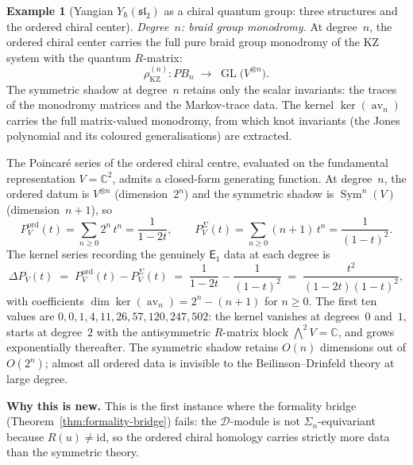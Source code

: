 \documentclass[11pt,reqno]{amsart}
\theoremstyle{definition}
\newtheorem{example}[theorem]{Example}
\theoremstyle{remark}
\newcommand{\cD}{\mathcal{D}}
\newcommand{\Eone}{\mathsf{E}_{1}}
\DeclareMathOperator{\av}{av}
\newcommand{\CC}{\mathbb{C}}
\newcommand{\id}{\mathrm{id}}
\numberwithin{equation}{section}
\begin{document}
\begin{example}[Yangian $Y_\hbar(\mathfrak{sl}_2)$
as a chiral quantum group: three structures and the
ordered chiral center]
\smallskip
\noindent\emph{Degree~$n$: braid group monodromy.}
At degree~$n$, the ordered chiral center carries the full
pure braid group monodromy of the KZ system with the
quantum $R$-matrix:
\[
  \rho_{\mathrm{KZ}}^{(n)} \colon PB_n
  \;\to\; \operatorname{GL}\bigl(V^{\otimes n}\bigr).
\]
The symmetric shadow at degree~$n$ retains only the scalar
invariants: the traces of the monodromy matrices and the
Markov-trace data. The kernel $\ker(\av_n)$ carries the
full matrix-valued monodromy, from which knot invariants
(the Jones polynomial and its coloured generalisations)
are extracted.

The Poincar\'e series of the ordered chiral centre,
evaluated on the fundamental representation $V = \CC^2$,
admits a closed-form generating function.
At degree~$n$, the ordered datum is $V^{\otimes n}$
(dimension~$2^n$) and the symmetric shadow is
$\operatorname{Sym}^n(V)$ (dimension~$n + 1$), so
\[
  P^{\mathrm{ord}}_{V}(t)
  = \sum_{n \geq 0} 2^n\, t^n
  = \frac{1}{1 - 2t},
  \qquad
  P^{\Sigma}_{V}(t)
  = \sum_{n \geq 0} (n+1)\, t^n
  = \frac{1}{(1-t)^2}.
\]
The kernel series recording the genuinely $\Eone$
data at each degree is
\begin{equation}\label{eq:yangian-kernel-gf}
  \Delta P_V(t)
  \;=\; P^{\mathrm{ord}}_V(t) - P^{\Sigma}_V(t)
  \;=\; \frac{1}{1-2t} - \frac{1}{(1-t)^2}
  \;=\; \frac{t^2}{(1 - 2t)(1 - t)^2},
\end{equation}
with coefficients
$\dim\ker(\av_n) = 2^n - (n+1)$
for $n \geq 0$. The first ten values are
$0, 0, 1, 4, 11, 26, 57, 120, 247, 502$:
the kernel vanishes at degrees~$0$ and~$1$,
starts at degree~$2$ with the antisymmetric
$R$-matrix block $\bigwedge^2 V = \CC$,
and grows exponentially thereafter.
The symmetric shadow retains $O(n)$ dimensions
out of $O(2^n)$; almost all ordered data is invisible
to the Beilinson--Drinfeld theory at large degree.

\medskip
\noindent
\textbf{Why this is new.}
This is the first instance where the formality bridge
(Theorem~\ref{thm:formality-bridge}) fails: the
$\cD$-module is not $\Sigma_n$-equivariant because
$R(u) \neq \id$, so the ordered chiral homology carries
strictly more data than the symmetric theory.


\end{example}
\end{document}
